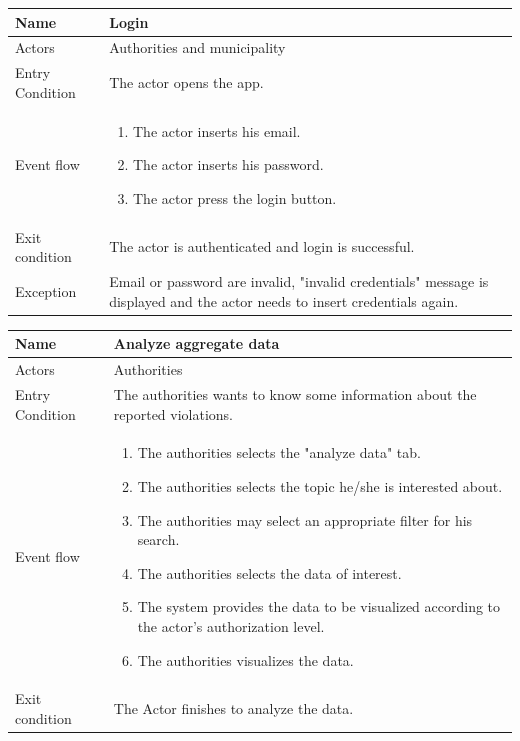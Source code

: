 \vskip 0.2in
\begin{tabular}{|p{3.1cm}|p{11.6cm}|}
\hline
Name & Login\\
\hline
Actors & Authorities and municipality\\
\hline
Entry Condition & The actor opens the app.\\
\hline
Event flow & \begin{enumerate}
                \item The actor inserts his email.
                \item The actor inserts his password.
                \item The actor press the login button.
            \end{enumerate}\\
\hline
Exit condition & The actor is authenticated and login is successful.\\
\hline
Exception & Email or password are invalid, "invalid credentials" message is displayed and the actor needs to insert credentials again.\\
\hline
\end{tabular}

\vskip 0.2in
\begin{tabular}{|p{3.1cm}|p{11.6cm}|}
\hline
Name & Analyze aggregate data\\
\hline
Actors & Authorities\\
\hline
Entry Condition & The authorities wants to know some information about the reported violations.\\
\hline
Event flow & \begin{enumerate}
                \item The authorities selects the "analyze data" tab.
                \item The authorities selects the topic he/she is interested about.
                \item The authorities may select an appropriate filter for his search.
                \item The authorities selects the data of interest.
                \item The system provides the data to be visualized according to the actor's authorization level.
                \item The authorities visualizes the data.
            \end{enumerate}\\
\hline
Exit condition & The Actor finishes to analyze the data.\\
\hline
\end{tabular}

